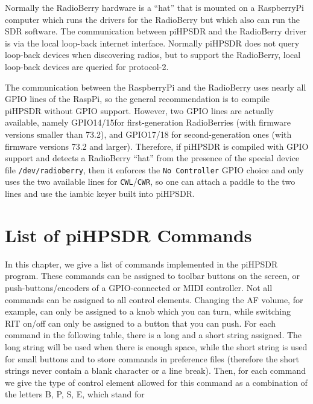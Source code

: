 \documentclass[12pt]{book}
\def\pH{pi\-HPSDR\xspace}
\begin{document}
Normally the RadioBerry hardware is a ``hat'' that is mounted on a RaspberryPi computer which runs
the drivers for the RadioBerry but which also can run the SDR software. The communication between
 \pH and the RadioBerry driver is via the local loop-back internet
interface. Normally \pH does not query loop-back devices when discovering radios, but to support
the RadioBerry, local loop-back devices are queried for protocol-2.

The communication between the RaspberryPi and the RadioBerry uses nearly all GPIO lines of the
RaspPi, so the general recommendation is to compile \pH without GPIO support. However, two GPIO lines
are actually available, namely GPIO14/15for first-generation RadioBerries
 (with firmware versions smaller than 73.2),
and GPIO17/18 for second-generation ones (with firmware versions 73.2 and larger).
Therefore, if \pH is compiled with GPIO support and detects a RadioBerry ``hat''
from the presence of the special device file  \texttt{/dev/radioberry},
then it enforces
the \texttt{No Controller} GPIO choice and only uses the two available lines for
\texttt{CWL}/\texttt{CWR}, so one can attach a paddle to the two lines and use the iambic
keyer built into \pH.


\appendix
\chapter{List of \pH Commands}
\label{sec:commandlist}

In this chapter, we give a list of commands implemented in the \pH program. These commands can be
assigned to toolbar buttons on the screen, or push-buttons/encoders of a GPIO-connected or MIDI controller.
Not all commands can be assigned to all control elements. Changing the AF volume, for example, can only be
assigned to a knob
which you can turn, while switching RIT on/off can only be assigned to a button that you can push. For each
command in the following table, there is a long and a short string assigned. The long string will be used
when there is enough space, while the short string is used for small buttons and to store commands in
preference files (therefore the short strings never contain a blank character or a line break). Then, for
each command we give the type of control element allowed for this command as a combination of the letters B,
P, S, E, which stand for
\end{document}

